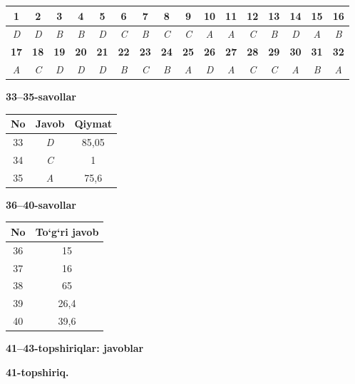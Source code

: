 \documentclass[11pt,a4paper]{article}
\begin{document}
\noindent\begin{tabular}{|c|c|c|c|c|c|c|c|c|c|c|c|c|c|c|c|}\hline
\textbf{1} & \textbf{2} & \textbf{3} & \textbf{4} & \textbf{5} & \textbf{6} & \textbf{7} & \textbf{8} & \textbf{9} & \textbf{10} & \textbf{11} & \textbf{12} & \textbf{13} & \textbf{14} & \textbf{15} & \textbf{16}\\\hline
\textsl{D} & \textsl{D} & \textsl{B} & \textsl{B} & \textsl{D} & \textsl{C} & \textsl{B} & \textsl{C} & \textsl{C} & \textsl{A} & \textsl{A} & \textsl{C} & \textsl{B} & \textsl{D} & \textsl{A} & \textsl{B}\\\hline
\textbf{17} & \textbf{18} & \textbf{19} & \textbf{20} & \textbf{21} & \textbf{22} & \textbf{23} & \textbf{24} & \textbf{25} & \textbf{26} & \textbf{27} & \textbf{28} & \textbf{29} & \textbf{30} & \textbf{31} & \textbf{32}\\\hline
\textsl{A} & \textsl{C} & \textsl{D} & \textsl{D} & \textsl{D} & \textsl{B} & \textsl{C} & \textsl{B} & \textsl{A} & \textsl{D} & \textsl{A} & \textsl{C} & \textsl{C} & \textsl{A} & \textsl{B} & \textsl{A}\\\hline
\end{tabular}\par\medskip
\noindent\textbf{33--35-savollar}\par\smallskip
\noindent\begin{tabular}{|c|c|c|}\hline \textbf{No} & \textbf{Javob} & \textbf{Qiymat}\\\hline
33 & \textsl{D} & 85,05\\\hline
34 & \textsl{C} & 1\\\hline
35 & \textsl{A} & 75,6\\\hline
\end{tabular}\par\medskip
\noindent\textbf{36--40-savollar}\par\smallskip
\noindent\begin{tabular}{|c|c|}\hline \textbf{No} & \textbf{To`g`ri javob}\\\hline
36 & 15\\\hline
37 & 16\\\hline
38 & 65\\\hline
39 & 26,4\\\hline
40 & 39,6\\\hline
\end{tabular}\par\medskip
\noindent\textbf{41--43-topshiriqlar: javoblar}\par\smallskip
\noindent\textbf{41-topshiriq.}\par
\end{document}
